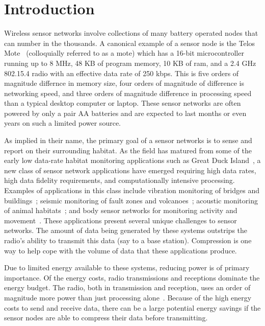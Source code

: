 \section{Introduction} 

Wireless sensor networks involve collections of many battery operated
nodes that can number in the thousands.  A canonical example of a
sensor node is the Telos Mote~\cite{telos} (colloquially referred to
as a mote) which has a 16-bit microcontroller running up to 8 MHz, 48
KB of program memory, 10 KB of ram, and a 2.4 GHz 802.15.4 radio with
an effective data rate of 250 kbps.  This is five orders of magnitude
differnce in memory size, four orders of magnitude of difference is
networking speed, and three orders of magnitude difference in
processing speed than a typical desktop computer or laptop.  These
sensor networks are often powered by only a pair AA batteries and are
expected to last months or even years on such a limited power source.

As implied in their name, the primary goal of a sensor networks is to
sense and report on their surrounding habitat. As the field has
matured from some of the early low data-rate habitat monitoring
applications such as Great Duck Island~\cite{gdi-sensys04}, a new
class of sensor network applications have emerged requiring high data
rates, high data fidelity requirements, and computationally intensive
processing. Examples of applications in this class include vibration
monitoring of bridges and
buildings~\cite{brimon,netshm-spots06,ggb-monitoring}; seismic
monitoring of fault zones and
volcanoes~\cite{ucla-seismic,volcano-osdi06}; acoustic monitoring of
animal habitats~\cite{girod-marmots,enviromic}; and body sensor
networks for monitoring activity and
movement~\cite{intel-msp,satire,parkinsons-embs07}.  These
applications present several unique challenges to sensor networks.
The amount of data being generated by these systems outstrips the
radio's ability to transmit this data (say to a base station).
Compression is one way to help cope with the volume of data that these
applications produce.  

Due to limited energy available to these systems, reducing power is of
primary importance.  Of the energy costs, radio transmissions and
receptions dominate the energy budget.  The radio, both in
transmission and reception, uses an order of magnitude more power than
just processing alone~\cite{telos}.  Because of the high energy costs
to send and receive data, there can be a large potential energy
savings if the sensor nodes are able to compress their data before
transmitting.

